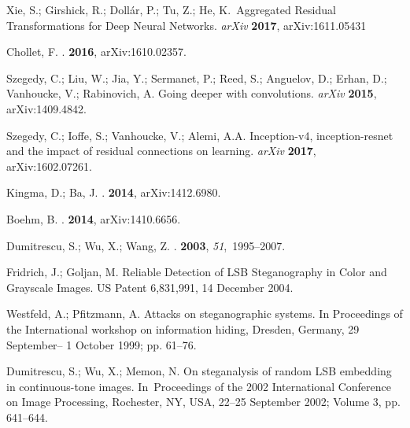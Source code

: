 \documentclass[futureinternet,article,accept,moreauthors,pdftex,10pt,a4paper]{Definitions/mdpi}
\begin{document}
\begin{thebibliography}{999}
Xie, S.; Girshick, R.; Dollár, P.; Tu, Z.; He, K.~{Aggregated Residual Transformations for Deep Neural Networks}.
\newblock \emph{arXiv}  \textbf{2017}, arXiv:1611.05431

Chollet, F.
.
 {\bf 2016},
\newblock arXiv:1610.02357.

Szegedy, C.; Liu, W.; Jia, Y.; Sermanet, P.; Reed, S.; Anguelov, D.; Erhan, D.;
  Vanhoucke, V.; Rabinovich, A.
\newblock Going deeper with convolutions.
\newblock \emph{arXiv} \textbf{2015}, arXiv:1409.4842.

Szegedy, C.; Ioffe, S.; Vanhoucke, V.; Alemi, A.A.
\newblock Inception-v4, inception-resnet and the impact of residual connections
  on learning. \emph{arXiv} \textbf{2017}, arXiv:1602.07261.

Kingma, D.; Ba, J.
.
 {\bf 2014},
\newblock arXiv:1412.6980.

Boehm, B.
.
 {\bf 2014},
\newblock arXiv:1410.6656.

Dumitrescu, S.; Wu, X.; Wang, Z.
.
 {\bf 2003}, {\em
  51},~1995--2007.

Fridrich, J.; Goljan, M.
\newblock Reliable Detection of LSB Steganography in Color and Grayscale
  Images. US Patent 6,831,991, 14 December 2004.


Westfeld, A.; Pfitzmann, A.
\newblock Attacks on steganographic systems. 
\newblock  In {Proceedings of the }International workshop on information hiding, Dresden, Germany,  29 September--  1 October 1999; pp. 61--76.

Dumitrescu, S.; Wu, X.; Memon, N.
\newblock On steganalysis of random LSB embedding in continuous-tone images. 
\newblock In~{Proceedings of the 2002 International Conference  on} Image Processing,  Rochester, NY, USA,  22--25 September 2002; Volume 3, pp. 641--644.



\end{thebibliography}
\end{document}
